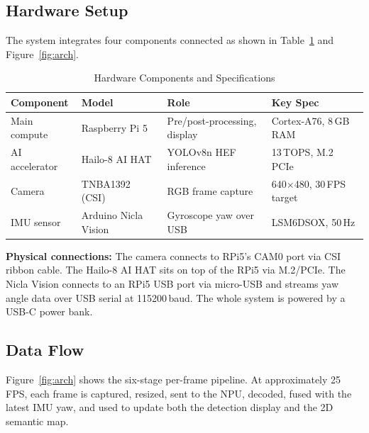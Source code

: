 \documentclass[journal, onecolumn]{IEEEtran}
\begin{document}
\subsection{Hardware Setup}

The system integrates four components connected as shown in Table~\ref{tab:hw} and Figure~\ref{fig:arch}.

\begin{table}[H]
\centering
\caption{Hardware Components and Specifications}
\label{tab:hw}
\begin{tabular}{llll}
\toprule
\textbf{Component} & \textbf{Model} & \textbf{Role} & \textbf{Key Spec} \\
\midrule
Main compute     & Raspberry Pi 5       & Pre/post-processing, display   & Cortex-A76, 8\,GB RAM \\
AI accelerator   & Hailo-8 AI HAT       & YOLOv8n HEF inference          & 13\,TOPS, M.2 PCIe \\
Camera           & TNBA1392 (CSI)       & RGB frame capture              & 640$\times$480, 30\,FPS target \\
IMU sensor       & Arduino Nicla Vision & Gyroscope yaw over USB         & LSM6DSOX, 50\,Hz \\
\bottomrule
\end{tabular}
\end{table}

\noindent\textbf{Physical connections:}
The camera connects to RPi5's CAM0 port via CSI ribbon cable. The Hailo-8 AI HAT sits on top of the RPi5 via M.2/PCIe. The Nicla Vision connects to an RPi5 USB port via micro-USB and streams yaw angle data over USB serial at 115200\,baud. The whole system is powered by a USB-C power bank.

\subsection{Data Flow}

Figure~\ref{fig:arch} shows the six-stage per-frame pipeline. At approximately 25\,FPS, each frame is captured, resized, sent to the NPU, decoded, fused with the latest IMU yaw, and used to update both the detection display and the 2D semantic map.
\end{document}
